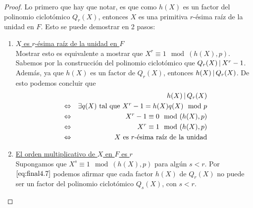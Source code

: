 \documentclass[10pt]{article}
\newcommand{\0}{\mathbf{0}}
\newcommand{\1}{\mathbf{1}}
\newcommand{\divi}{\hspace{1.8pt}|\hspace{1.8pt}}
\newcommand{\modulohp}{\mod (h(X),p)}
\newcommand{\modl}{\mod}
\newcommand{\+}{\oplus}
\theoremstyle{remark}
\theoremstyle{remark}
\begin{document}
	\begin{proof}
		Lo primero que hay que notar, es que como $h(X)$ es un factor del polinomio ciclotómico $Q_r(X)$, entonces $X$ es una primitiva $r$-ésima raí­z de la unidad en $F$. Esto se puede demostrar en 2 pasos:
		\begin{enumerate}
			\item \underline{$X$ es $r$-ésima raí­z de la unidad en $F$}\\
			Mostrar esto es equivalente a mostrar que $X^r\equiv 1\modulohp$.\\
			Sabemos por la construcción del polinomio ciclotómico que $Q_r(X)\divi  X^r-1$. Además, ya que $h(X)$ es un factor de $Q_r(X)$, entonces $h(X)\divi  Q_r(X)$. De esto podemos concluir que 
			\begin{eqnarray}
				& &h(X)\divi  Q_r(X)\nonumber\\
				&\Leftrightarrow &\exists q(X) \text{ tal que }X^r-1 = h(X)q(X)\modl p\nonumber\\
				&\Leftrightarrow &X^r -1 \equiv 0 \modulohp\nonumber\\
				&\Leftrightarrow &X^r  \equiv 1 \modulohp\nonumber\\
				&\Leftrightarrow &X \text{ es }r\text{-ésima raí­z de la unidad}\nonumber
			\end{eqnarray}	
			\item \underline{El orden multiplicativo de $X$ en $F$ es $r$}\\
			Supongamos que $X^s\equiv 1 \modulohp$ para algún $s<r$.
			Por $\eqref{eq:final4.7}$ podemos afirmar que cada factor $h(X)$ de $Q_r(X)$ no puede ser un factor del polinomio ciclotómico $Q_s(X)$, con $s<r$.
			

\end{enumerate}
\end{proof}
\end{document}
